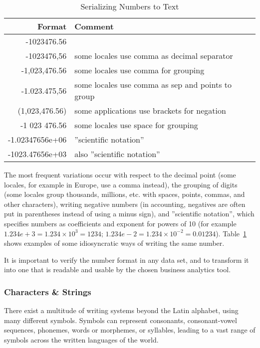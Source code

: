 \begin{table}[h]
\renewcommand{\arraystretch}{1.25}
\centering

\begin{tabular}{r|l} \hline
\textbf{Format} & \textbf{Comment} \\ \hline
-1023476.56 & \\
-1023476,56 & some locales use comma as decimal separator \\
-1,023,476.56 & some locales use comma for grouping \\
-1.023.475,56 & some locales use comma as sep and points to group \\
(1,023,476.56) & some applications use brackets for negation \\
-1 023 476.56 & some locales use space for grouping \\
-1.02347656e+06 & ''scientific notation'' \\
-1023.47656e+03 & also ''scientific notation'' \\ \hline
\end{tabular}
\caption{Serializing Numbers to Text}
\label{tab:floatingpointtext}
\end{table}

The most frequent variations occur with respect to the decimal point (some locales, for example in Europe, use a comma instead), the grouping of digits (some locales group thousands, millions, etc. with spaces, points, commas, and other characters), writing negative numbers (in accounting, negatives are often put in parentheses instead of using a minus sign), and ''scientific notation'', which specifies numbers as coefficients and exponent for powers of 10 (for example $1.234e+3 = 1.234 \times 10^3 = 1234$; $1.234e-2 = 1.234 \times 10^{-2} = 0.01234$). Table~\ref{tab:floatingpointtext} shows examples of some idiosyncratic ways of writing the same number. 

\begin{tcolorbox}[colback=alert]
It is important to verify the number format in any data set, and to transform it into one that is readable and usable by the chosen business analytics tool. 
\end{tcolorbox}

\subsubsection*{Characters \& Strings}

There exist a multitude of writing systems beyond the Latin alphabet, using many different symbols. Symbols can represent consonants, consonant-vowel sequences, phonemes, words or morphemes, or syllables, leading to a vast range of symbols across the written languages of the world. 

